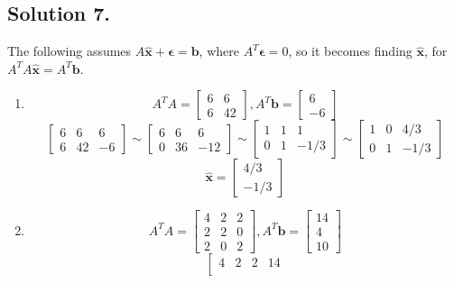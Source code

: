 \documentclass{article}
\begin{document}
\subsection*{Solution 7.}
The following assumes $A\mathbf{\hat{x}}+\mathbf{\epsilon}=\mathbf{b}$, where $A^T\mathbf{\epsilon}=0$, so it becomes finding $\mathbf{\hat{x}}$, for $A^TA\mathbf{\hat{x}}=A^T\mathbf{b}$.
\begin{enumerate} [label=(\arabic*)]
    \item 
    \[A^TA=\left[\begin{array}{rr}
    6 & 6 \\
    6 & 42
    \end{array}\right],A^T\mathbf{b}=\left[\begin{array}{r}
    6\\-6\end{array}\right]\]
    \[\left[\begin{array}{rrr}
    6 & 6 & 6 \\
    6 &42 & -6 
    \end{array}\right]\sim
    \left[\begin{array}{rrr}
    6 & 6 & 6 \\
    0 &36 & -12 
    \end{array}\right]\sim
    \left[\begin{array}{rrr}
    1 & 1 & 1 \\
    0 &1 & -1/3 
    \end{array}\right]\sim
    \left[\begin{array}{rrr}
    1 & 0 & 4/3 \\
    0 &1 & -1/3 
    \end{array}\right]
    \]
    \[\mathbf{\hat{x}}=\left[\begin{array}{r}
    4/3\\-1/3\end{array}\right]\]
    \item 
    \[A^TA=\left[\begin{array}{rrr}
    4 & 2 & 2\\
    2 & 2 & 0 \\
    2 & 0 & 2
    \end{array}\right],A^T\mathbf{b}=\left[\begin{array}{r}
    14\\4\\10\end{array}\right]\]
    \[\left[\begin{array}{rrrr}
    4 & 2 & 2 & 14 \\

\end{array}\]
\end{enumerate}
\end{document}
